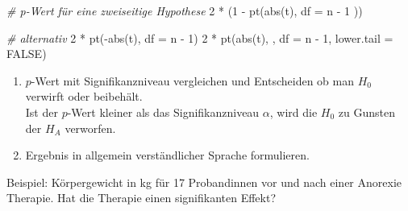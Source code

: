 \documentclass[
]{book}
\newenvironment{Shaded}{\begin{snugshade}}{\end{snugshade}}
\newcommand{\AttributeTok}[1]{\textcolor[rgb]{0.77,0.63,0.00}{#1}}
\newcommand{\CommentTok}[1]{\textcolor[rgb]{0.56,0.35,0.01}{\textit{#1}}}
\newcommand{\ConstantTok}[1]{\textcolor[rgb]{0.00,0.00,0.00}{#1}}
\newcommand{\DecValTok}[1]{\textcolor[rgb]{0.00,0.00,0.81}{#1}}
\newcommand{\FunctionTok}[1]{\textcolor[rgb]{0.00,0.00,0.00}{#1}}
\newcommand{\NormalTok}[1]{#1}
\newcommand{\SpecialCharTok}[1]{\textcolor[rgb]{0.00,0.00,0.00}{#1}}
\begin{document}
\begin{Shaded}
\begin{Highlighting}[]
\CommentTok{\# p{-}Wert für eine zweiseitige Hypothese}
\DecValTok{2} \SpecialCharTok{*}\NormalTok{ (}\DecValTok{1} \SpecialCharTok{{-}} \FunctionTok{pt}\NormalTok{(}\FunctionTok{abs}\NormalTok{(t), }\AttributeTok{df =}\NormalTok{ n }\SpecialCharTok{{-}} \DecValTok{1}\NormalTok{ ))}

\CommentTok{\# alternativ}
\DecValTok{2} \SpecialCharTok{*} \FunctionTok{pt}\NormalTok{(}\SpecialCharTok{{-}}\FunctionTok{abs}\NormalTok{(t), }\AttributeTok{df =}\NormalTok{ n }\SpecialCharTok{{-}} \DecValTok{1}\NormalTok{)}
\DecValTok{2} \SpecialCharTok{*} \FunctionTok{pt}\NormalTok{(}\FunctionTok{abs}\NormalTok{(t), , }\AttributeTok{df =}\NormalTok{ n }\SpecialCharTok{{-}} \DecValTok{1}\NormalTok{, }\AttributeTok{lower.tail =} \ConstantTok{FALSE}\NormalTok{)}
\end{Highlighting}
\end{Shaded}

\begin{enumerate}
\def\labelenumi{\arabic{enumi}.}
\setcounter{enumi}{6}
\item
  \(p\)-Wert mit Signifikanzniveau vergleichen und Entscheiden ob man \(H_0\) verwirft oder beibehält.\\
  Ist der \(p\)-Wert kleiner als das Signifikanzniveau \(\alpha\), wird die \(H_0\) zu Gunsten der \(H_A\) verworfen.
\item
  Ergebnis in allgemein verständlicher Sprache formulieren.
\end{enumerate}

Beispiel: Körpergewicht in kg für 17 Probandinnen vor und nach einer Anorexie Therapie. Hat die Therapie einen signifikanten Effekt?
\end{document}
